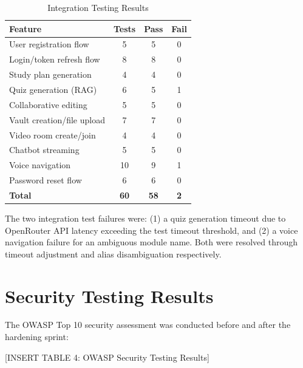 \documentclass[12pt,a4paper]{report}
\begin{document}
\begin{table}[h]
\centering
\caption{Integration Testing Results}
\begin{tabular}{lccc}
\toprule
\textbf{Feature} & \textbf{Tests} & \textbf{Pass} & \textbf{Fail} \\
\midrule
User registration flow & 5 & 5 & 0 \\
Login/token refresh flow & 8 & 8 & 0 \\
Study plan generation & 4 & 4 & 0 \\
Quiz generation (RAG) & 6 & 5 & 1 \\
Collaborative editing & 5 & 5 & 0 \\
Vault creation/file upload & 7 & 7 & 0 \\
Video room create/join & 4 & 4 & 0 \\
Chatbot streaming & 5 & 5 & 0 \\
Voice navigation & 10 & 9 & 1 \\
Password reset flow & 6 & 6 & 0 \\
\midrule
\textbf{Total} & \textbf{60} & \textbf{58} & \textbf{2} \\
\bottomrule
\end{tabular}
\label{tab:integration-tests}
\end{table}

The two integration test failures were: (1) a quiz generation timeout due to OpenRouter API latency exceeding the test timeout threshold, and (2) a voice navigation failure for an ambiguous module name. Both were resolved through timeout adjustment and alias disambiguation respectively.

\section{Security Testing Results}

The OWASP Top 10 security assessment was conducted before and after the hardening sprint:

[INSERT TABLE 4: OWASP Security Testing Results]
\end{document}
